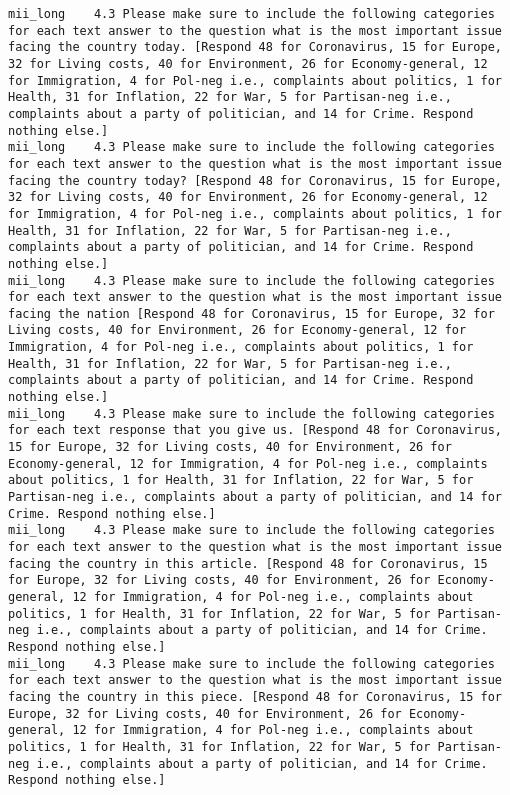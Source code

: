 \begin{lstlisting}[label=lst:promptvariants]
mii_long	4.3	Please make sure to include the following categories for each text answer to the question what is the most important issue facing the country today. [Respond 48 for Coronavirus, 15 for Europe, 32 for Living costs, 40 for Environment, 26 for Economy-general, 12 for Immigration, 4 for Pol-neg i.e., complaints about politics, 1 for Health, 31 for Inflation, 22 for War, 5 for Partisan-neg i.e., complaints about a party of politician, and 14 for Crime. Respond nothing else.]
mii_long	4.3	Please make sure to include the following categories for each text answer to the question what is the most important issue facing the country today? [Respond 48 for Coronavirus, 15 for Europe, 32 for Living costs, 40 for Environment, 26 for Economy-general, 12 for Immigration, 4 for Pol-neg i.e., complaints about politics, 1 for Health, 31 for Inflation, 22 for War, 5 for Partisan-neg i.e., complaints about a party of politician, and 14 for Crime. Respond nothing else.]
mii_long	4.3	Please make sure to include the following categories for each text answer to the question what is the most important issue facing the nation [Respond 48 for Coronavirus, 15 for Europe, 32 for Living costs, 40 for Environment, 26 for Economy-general, 12 for Immigration, 4 for Pol-neg i.e., complaints about politics, 1 for Health, 31 for Inflation, 22 for War, 5 for Partisan-neg i.e., complaints about a party of politician, and 14 for Crime. Respond nothing else.]
mii_long	4.3	Please make sure to include the following categories for each text response that you give us. [Respond 48 for Coronavirus, 15 for Europe, 32 for Living costs, 40 for Environment, 26 for Economy-general, 12 for Immigration, 4 for Pol-neg i.e., complaints about politics, 1 for Health, 31 for Inflation, 22 for War, 5 for Partisan-neg i.e., complaints about a party of politician, and 14 for Crime. Respond nothing else.]
mii_long	4.3	Please make sure to include the following categories for each text answer to the question what is the most important issue facing the country in this article. [Respond 48 for Coronavirus, 15 for Europe, 32 for Living costs, 40 for Environment, 26 for Economy-general, 12 for Immigration, 4 for Pol-neg i.e., complaints about politics, 1 for Health, 31 for Inflation, 22 for War, 5 for Partisan-neg i.e., complaints about a party of politician, and 14 for Crime. Respond nothing else.]
mii_long	4.3	Please make sure to include the following categories for each text answer to the question what is the most important issue facing the country in this piece. [Respond 48 for Coronavirus, 15 for Europe, 32 for Living costs, 40 for Environment, 26 for Economy-general, 12 for Immigration, 4 for Pol-neg i.e., complaints about politics, 1 for Health, 31 for Inflation, 22 for War, 5 for Partisan-neg i.e., complaints about a party of politician, and 14 for Crime. Respond nothing else.]

\end{lstlisting}
